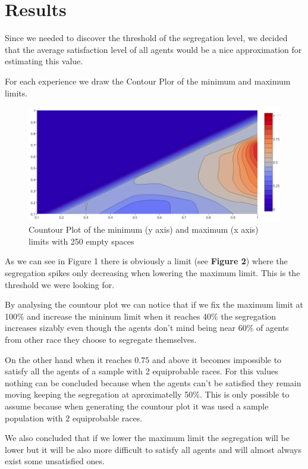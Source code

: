 \documentclass[a4paper,titlepage,11pt]{article}
\begin{document}
\newpage

\section{Results}

Since we needed to discover the threshold of the segregation level, we decided that the average satisfaction level of all agents would be a nice approximation for estimating this value.

For each experience we draw the Contour Plor of the minimum and maximum limits.

\begin{figure}[h]
    \centering
    \includegraphics[scale=0.40]{img/ploty.png}
    \caption{Countour Plot of the minimum (y axis) and maximum (x axis) limits with 250 empty spaces}
\end{figure}

As we can see in Figure 1 there is obviously a limit (see \textbf{Figure 2}) where the segregation spikes only decreasing
when lowering the maximum limit. This is the threshold we were looking for.

By analysing the countour plot we can notice that if we fix the maximum limit at 100\% and increase the mininum limit when
it reaches 40\% the segregation increases sizably even though the agents don't mind being near 60\% of agents from other
race they choose to segregate themselves.

On the other hand when it reaches $0.75$ and above it becomes impossible to satisfy all the agents of a sample with 2
equiprobable races. For this values nothing can be concluded because when the agents can't be satisfied they remain moving
keeping the segregation at aproximatelly 50\%. This is only possible to assume because when generating the countour plot
it was used a sample population with 2 equiprobable races.

We also concluded that if we lower the maximum limit the segregation will be lower but it will be also more difficult to
satisfy all agents and will almost always exist some unsatisfied ones.
\end{document}

